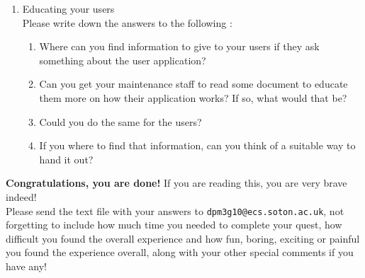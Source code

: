 \documentclass[12pt]{article}
\begin{document}
\begin{enumerate}
\item Educating your users\\
Please write down the answers to the following :
\begin{enumerate}
\item Where can you find information to give to your users if they ask something about the user application?
\item Can you get your maintenance staff to read some document to educate them more on how their application works? If so, what would that be?
\item Could you do the same for the users?
\item If you where to find that information, can you think of a suitable way to hand it out?

\end{enumerate}

\end{enumerate}

\vspace{5em}
\textbf{Congratulations, you are done!} If you are reading this, you are very brave indeed!\\

Please send the text file with your answers to \texttt{dpm3g10@ecs.soton.ac.uk}, not forgetting to include how much time you needed to complete your quest, how difficult you found the overall experience and how fun, boring, exciting or painful you found the experience overall, along with your other special comments if you have any!
\end{document}
